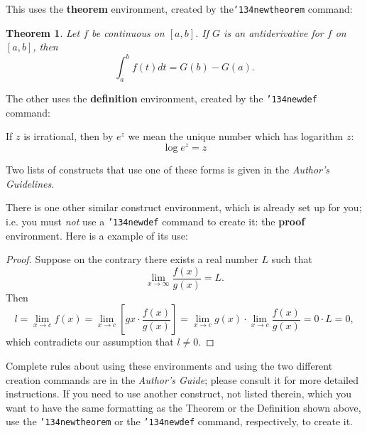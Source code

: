\documentclass{aamas2012}
\begin{document}
This uses the \textbf{theorem} environment, created by
the\linebreak\texttt{{\char'134}newtheorem} command:
\newtheorem{theorem}{Theorem}
\begin{theorem}
Let $f$ be continuous on $[a,b]$.  If $G$ is
an antiderivative for $f$ on $[a,b]$, then
\begin{displaymath}\int^b_af(t)dt = G(b) - G(a).\end{displaymath}
\end{theorem}

The other uses the \textbf{definition} environment, created
by the \texttt{{\char'134}newdef} command:
\begin{definition}
If $z$ is irrational, then by $e^z$ we mean the
unique number which has
logarithm $z$: \begin{displaymath}{\log e^z = z}\end{displaymath}
\end{definition}

Two lists of constructs that use one of these
forms is given in the
\textit{Author's  Guidelines}.

There is one other similar construct environment, which is
already set up
for you; i.e. you must \textit{not} use
a \texttt{{\char'134}newdef} command to
create it: the \textbf{proof} environment.  Here
is a example of its use:
\begin{proof}
Suppose on the contrary there exists a real number $L$ such that
\begin{displaymath}
\lim_{x\rightarrow\infty} \frac{f(x)}{g(x)} = L.
\end{displaymath}
Then
\begin{displaymath}
l=\lim_{x\rightarrow c} f(x)
= \lim_{x\rightarrow c}
\left[ g{x} \cdot \frac{f(x)}{g(x)} \right ]
= \lim_{x\rightarrow c} g(x) \cdot \lim_{x\rightarrow c}
\frac{f(x)}{g(x)} = 0\cdot L = 0,
\end{displaymath}
which contradicts our assumption that $l\neq 0$.
\end{proof}

Complete rules about using these environments and using the
two different creation commands are in the
\textit{Author's Guide}; please consult it for more
detailed instructions.  If you need to use another construct,
not listed therein, which you want to have the same
formatting as the Theorem
or the Definition\cite{salas:calculus} shown above,
use the \texttt{{\char'134}newtheorem} or the
\texttt{{\char'134}newdef} command,
respectively, to create it.
\end{document}
